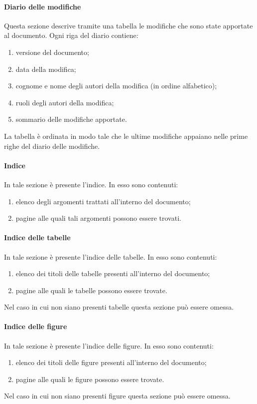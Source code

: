 			\paragraph{Diario delle modifiche}
				Questa sezione descrive tramite una tabella le modifiche che sono state apportate al documento. Ogni riga del diario contiene:
				\begin{enumerate}
					\item versione del documento;
					\item data della modifica;
					\item cognome e nome degli autori della modifica (in ordine alfabetico);
					\item ruoli degli autori della modifica;
					\item sommario delle modifiche apportate.
				\end{enumerate}
				La tabella è ordinata in modo tale che le ultime modifiche appaiano nelle prime righe del diario delle modifiche.
			\paragraph{Indice}
				In tale sezione è presente l’indice. In esso sono contenuti:
				\begin{enumerate}
					\item elenco degli argomenti trattati all’interno del documento;
					\item pagine alle quali tali argomenti possono essere trovati.
				\end{enumerate}
			\paragraph{Indice delle tabelle}
				In tale sezione è presente l’indice delle tabelle. In esso sono contenuti:
				\begin{enumerate}
					\item elenco dei titoli delle tabelle presenti all’interno del documento;
					\item pagine alle quali le tabelle possono essere trovate.
				\end{enumerate}
				Nel caso in cui non siano presenti tabelle questa sezione può essere omessa.
			\paragraph{Indice delle figure}
				In tale sezione è presente l’indice delle figure. In esso sono contenuti:
				\begin{enumerate}
					\item elenco dei titoli delle figure presenti all’interno del documento;
					\item pagine alle quali le figure possono essere trovate.
				\end{enumerate}
				Nel caso in cui non siano presenti figure questa sezione può essere omessa.

